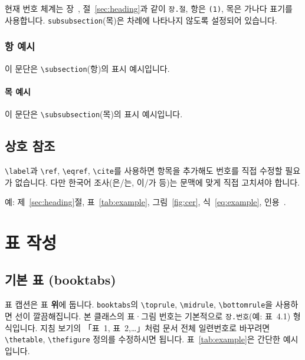 \documentclass[korean]{aisw}
\begin{document}
현재 번호 체계는 장~,
절~\ref{sec:heading}과 같이
\texttt{장.절}, 항은 \texttt{(1)}, 목은 가나다 표기를 사용합니다.
\texttt{subsubsection}(목)은 차례에 나타나지 않도록 설정되어 있습니다.

\subsection{항 예시}

이 문단은 \texttt{\textbackslash subsection}(항)의 표시 예시입니다.

\subsubsection{목 예시}

이 문단은 \texttt{\textbackslash subsubsection}(목)의 표시 예시입니다.

\section{상호 참조}

\texttt{\textbackslash label}과 \texttt{\textbackslash ref},
\texttt{\textbackslash eqref}, \texttt{\textbackslash cite}를 사용하면
항목을 추가해도 번호를 직접 수정할 필요가 없습니다.
다만 한국어 조사(은/는, 이/가 등)는 문맥에 맞게 직접 고치셔야 합니다.

예: 제~\ref{sec:heading}절, 표~\ref{tab:example}, 그림~\ref{fig:cer},
식~\eqref{eq:example}, 인용~\cite{shin2012sounds}.

\chapter{표 작성}

\section{기본 표 (booktabs)}

표 캡션은 표 \textbf{위}에 둡니다.
\texttt{booktabs}의 \texttt{\textbackslash toprule},
\texttt{\textbackslash midrule},
\texttt{\textbackslash bottomrule}을 사용하면
선이 깔끔해집니다.
본 클래스의 표·그림 번호는 기본적으로 \texttt{장.번호}(예: 표~4.1) 형식입니다.
지침 보기의 「표~1, 표~2,\ldots」처럼 문서 전체 일련번호로 바꾸려면
\texttt{\textbackslash thetable}, \texttt{\textbackslash thefigure} 정의를 수정하시면 됩니다.
표~\ref{tab:example}은 간단한 예시입니다.
\end{document}
